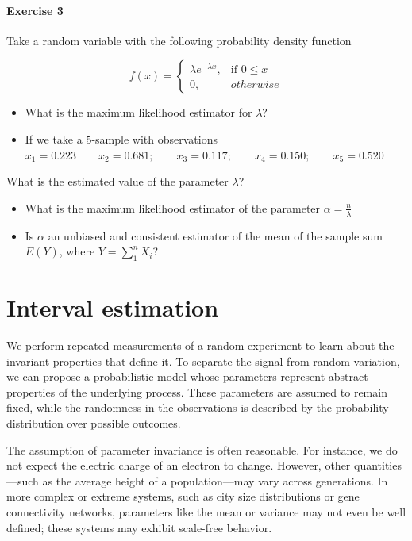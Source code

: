 \documentclass[
]{book}
\begin{document}
\hypertarget{exercise-3-7}{%
\subsubsection{Exercise 3}\label{exercise-3-7}}

Take a random variable with the following probability density function

\[
    f(x)= 
\begin{cases}
    \lambda e^{-\lambda x},& \text{if } 0 \leq x\\
    0,& otherwise 
\end{cases}
\]

\begin{itemize}
\item
  What is the maximum likelihood estimator for \(\lambda\)?
\item
  If we take a \(5\)-sample with observations
  \(x_1 = 0.223 \qquad x_2 = 0.681; \qquad x_3 = 0.117; \qquad x_4 = 0.150; \qquad x_5 = 0.520\)
\end{itemize}

What is the estimated value of the parameter \(\lambda\)?

\begin{itemize}
\item
  What is the maximum likelihood estimator of the parameter \(\alpha=\frac{n}{\lambda}\)
\item
  Is \(\alpha\) an unbiased and consistent estimator of the mean of the sample sum \(E(Y)\), where \(Y=\sum_1^n X_i\)?
\end{itemize}

\hypertarget{interval-estimation}{%
\chapter{Interval estimation}\label{interval-estimation}}

We perform repeated measurements of a random experiment to learn about the invariant properties that define it. To separate the signal from random variation, we can propose a probabilistic model whose parameters represent abstract properties of the underlying process. These parameters are assumed to remain fixed, while the randomness in the observations is described by the probability distribution over possible outcomes.

The assumption of parameter invariance is often reasonable. For instance, we do not expect the electric charge of an electron to change. However, other quantities---such as the average height of a population---may vary across generations. In more complex or extreme systems, such as city size distributions or gene connectivity networks, parameters like the mean or variance may not even be well defined; these systems may exhibit scale-free behavior.
\end{document}
